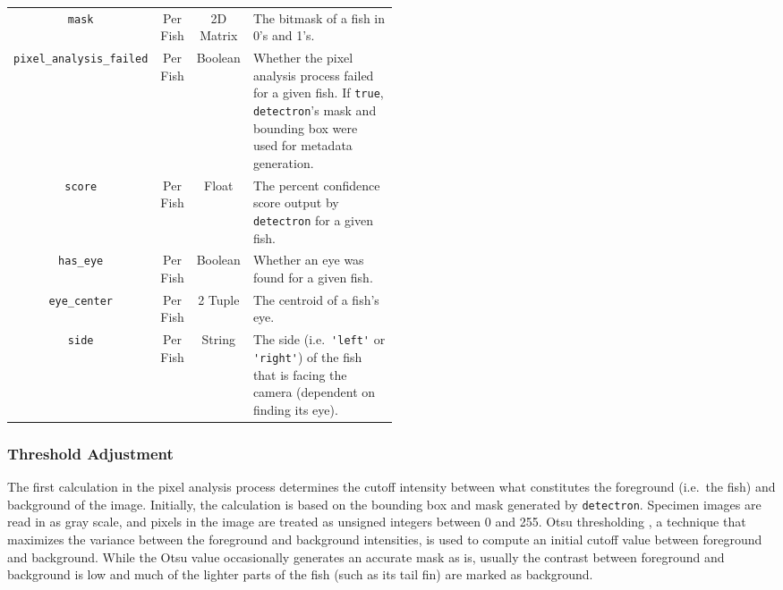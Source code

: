 \documentclass[conference]{IEEEtran}
\begin{document}
\begin{table}[t]
\begin{tabular}{cccp{0.5\linewidth}}
        \verb|mask| & Per Fish & 2D Matrix & The bitmask of a fish in 0's and 1's.\\
        \verb|pixel_analysis_failed| & Per Fish & Boolean & Whether the pixel analysis process failed for a given fish. If \verb|true|, \verb|detectron|'s mask and bounding box were used for metadata generation.\\
        \verb|score| & Per Fish & Float & The percent confidence score output by \verb|detectron| for a given fish.\\
        \verb|has_eye| & Per Fish & Boolean & Whether an eye was found for a given fish.\\
        \verb|eye_center| & Per Fish & 2 Tuple & The centroid of a fish's eye.\\
        \verb|side| & Per Fish & String & The side (i.e.\ \verb|'left'| or \verb|'right'|) of the fish that is facing the camera (dependent on finding its eye).\\
      \bottomrule
\end{tabular}
\end{table}

\subsubsection{Threshold Adjustment}
The first calculation in the pixel analysis process determines the cutoff intensity between what constitutes the foreground (i.e.~the fish) and background of the image.
Initially, the calculation is based on the bounding box and mask generated by
\verb|detectron|. Specimen images are read in as gray scale, and pixels in the image are treated as unsigned integers between 0 and 255.
Otsu thresholding \cite{Otsu1979ATS}, a technique that maximizes the variance between the 
foreground and background intensities, is used to compute an initial cutoff value between foreground and background. 
While the Otsu value occasionally generates an accurate mask as is, usually
the contrast between foreground and background is low and much of the lighter parts of the fish (such as its tail fin) are marked as background.
\end{document}
